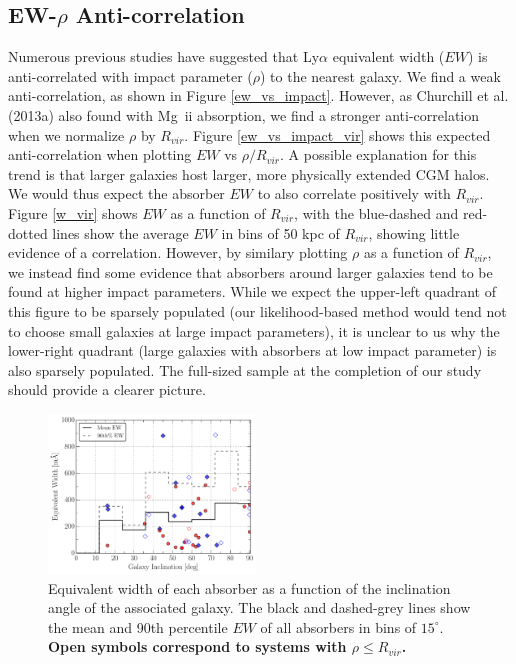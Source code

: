 \documentclass[twocolumn,tighten]{aastex6}
\begin{document}
\vspace{10pt}


\subsection{EW-$\rho$ Anti-correlation}
\label{ew}

Numerous previous studies have suggested that Ly$\alpha$ equivalent width ($EW$) is anti-correlated with impact parameter ($\rho$) to the nearest galaxy. We find a weak anti-correlation, as shown in Figure \ref{ew_vs_impact}. However, as Churchill et al. (2013a) also found with Mg \,{\sc ii} absorption, we find a stronger anti-correlation when we normalize $\rho$ by $R_{vir}$. Figure \ref{ew_vs_impact_vir} shows this expected anti-correlation when plotting $EW$ vs $\rho/R_{vir}$. A possible explanation for this trend is that larger galaxies host larger, more physically extended CGM halos. We would thus expect the absorber $EW$ to also correlate positively with $R_{vir}$. Figure \ref{w_vir} shows $EW$ as a function of $R_{vir}$, with the blue-dashed and red-dotted lines show the average $EW$ in bins of 50 kpc of $R_{vir}$, showing little evidence of a correlation. However, by similary plotting $\rho$ as a function of $R_{vir}$, we instead find some evidence that absorbers around larger galaxies tend to be found at higher impact parameters. While we expect the upper-left quadrant of this figure to be sparsely populated (our likelihood-based method would tend not to choose small galaxies at large impact parameters), it is unclear to us why the lower-right quadrant (large galaxies with absorbers at low impact parameter) is also sparsely populated. The full-sized sample at the completion of our study should provide a clearer picture.


\begin{figure}[h!]
        \centering
        \includegraphics[width=0.49\textwidth]{fig8.pdf}
        \caption{\small{Equivalent width of each absorber as a function of the inclination angle of the associated galaxy. The black and dashed-grey lines show the mean and 90th percentile $EW$ of all absorbers in bins of $15^{\circ}$. \textbf{Open symbols correspond to systems with $\rho \leq R_{vir}$.}}}
        \label{ew_vs_inclination}
        \vspace{2pt}
\end{figure}
\end{document}
